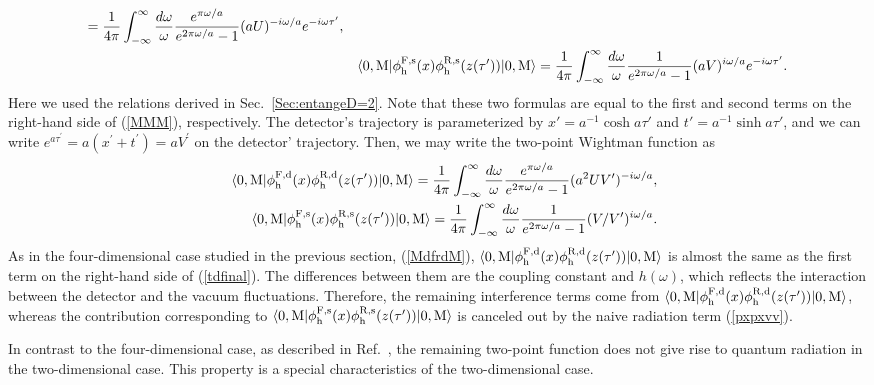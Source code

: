 \documentclass[aps,prd,preprintnumbers,nofootinbib,showpacs]{revtex4}%
\begin{document}
\begin{widetext}
\begin{eqnarray}
=
{1\over 4\pi}\int_{-\infty}^\infty {d\omega\over \omega}
{e^{\pi\omega/a}\over e^{2\pi\omega/a}-1}
(aU)^{-{{i \omega}/ a}}e^{-i\omega\tau'},
\\
&&\langle 0,{\rm M}| \phi_{\rm h}^{\rm F,s}(x) \phi_{\rm h}^{\rm R,s}(z(\tau'))|0, {\rm M}\rangle
=
{1\over 4\pi}\int_{-\infty}^\infty {d\omega\over \omega}
{1\over e^{2\pi\omega/a} -1}
(aV)^{{i \omega}/ a}
e^{-i\omega\tau'}.
\end{eqnarray}
Here we used the relations derived in Sec.~\ref{Sec:entangeD=2}. 
Note that these two formulas are equal to the first 
and second terms on the right-hand side of (\ref{MMM}), respectively. 
The detector's trajectory is parameterized by 
$x'={a}^{-1}\cosh a\tau'$ and $t'={a}^{-1}\sinh a\tau'$, 
and we can write $e^{a\tau^{\prime}}=a(x^{\prime}+t^{\prime})=aV^{\prime}$
on the detector' trajectory. 
Then, we may write the two-point Wightman function as 
\begin{eqnarray}
&&\langle 0,{\rm M}| \phi_{\rm h}^{\rm F,d}(x) \phi_{\rm h}^{\rm R,d}(z(\tau'))|0, {\rm M}\rangle
=
{1\over 4\pi}\int_{-\infty}^\infty {d\omega\over \omega}
{e^{\pi\omega/a}\over e^{2\pi\omega/a}-1}
(a^2 UV^{\prime} )^{-i\omega/ a},
\label{MdfrdM}
\\
&&\langle 0,{\rm M}| \phi_{\rm h}^{\rm F,s}(x) \phi_{\rm h}^{\rm R,s}(z(\tau'))|0, {\rm M}\rangle
=
{1\over 4\pi}\int_{-\infty}^\infty {d\omega\over \omega}
{1\over e^{2\pi\omega/a} -1}
(V /V^{\prime})^{i\omega / a}.
\label{MsfsdM}
\end{eqnarray}
As in the four-dimensional case studied in the previous section, (\ref{MdfrdM}), 
$\langle 0,{\rm M}| \phi_{\rm h}^{\rm F,d}(x) \phi_{\rm h}^{\rm R,d}(z(\tau'))|0, {\rm M}\rangle$
is almost the same as the first term on the right-hand side of (\ref{tdfinal}). 
The differences between them are the coupling constant and $h(\omega)$, which reflects the
interaction between the detector and the vacuum fluctuations. 
Therefore, the remaining interference terms come from 
$\langle 0,{\rm M}| \phi_{\rm h}^{\rm F,d}(x) \phi_{\rm h}^{\rm R,d}(z(\tau'))|0, {\rm M}\rangle$, 
whereas the contribution corresponding to 
$\langle 0,{\rm M}| \phi_{\rm h}^{\rm F,s}(x) \phi_{\rm h}^{\rm R,s}(z(\tau'))|0, {\rm M}\rangle$ 
is canceled out by the naive radiation term (\ref{pxpxvv}). 

In contrast to the four-dimensional case, as described in Ref.~\cite{HuRaval}, 
the remaining two-point function does not give rise to quantum radiation in 
the two-dimensional case. 
This property is a special characteristics of the two-dimensional case. 


\end{widetext}
\end{document}
